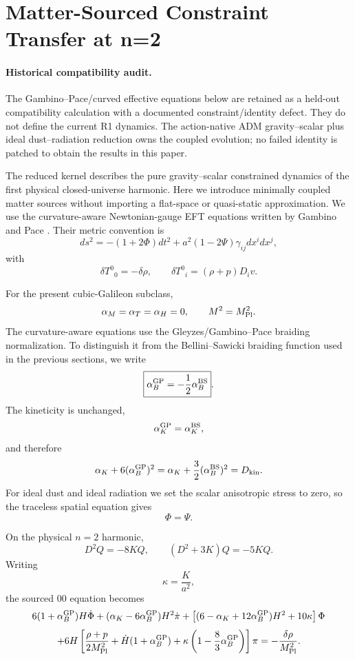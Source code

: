 \section{Matter-Sourced Constraint Transfer at n=2}

\paragraph{Historical compatibility audit.}
The Gambino--Pace/curved effective equations below are retained as a
held-out compatibility calculation with a documented constraint/identity
defect. They do not define the current R1 dynamics. The action-native
ADM gravity--scalar plus ideal dust--radiation reduction owns the coupled
evolution; no failed identity is patched to obtain the results in this paper.

The reduced kernel describes the pure gravity--scalar constrained dynamics of the first physical closed-universe harmonic. Here we introduce minimally coupled matter sources without importing a flat-space or quasi-static approximation. We use the curvature-aware Newtonian-gauge EFT equations written by Gambino and Pace \citep{GambinoPace2024}. Their metric convention is
\[
ds^2
=
-(1+2\Phi)dt^2
+
a^2(1-2\Psi)\gamma_{ij}dx^idx^j,
\]
with
\[
\delta T^0{}_0=-\delta\rho,
\qquad
\delta T^0{}_i=(\rho+p)D_i v.
\]

For the present cubic-Galileon subclass,
\[
\alpha_M=\alpha_T=\alpha_H=0,
\qquad
M^2=M_{\rm Pl}^2.
\]
The curvature-aware equations use the Gleyzes/Gambino--Pace braiding normalization. To distinguish it from the Bellini--Sawicki braiding function used in the previous sections, we write
\[
\boxed{
\alpha_B^{\rm GP}
=
-\frac12\alpha_B^{\rm BS}
}.
\]
The kineticity is unchanged,
\[
\alpha_K^{\rm GP}=\alpha_K^{\rm BS},
\]
and therefore
\[
\alpha_K+6(\alpha_B^{\rm GP})^2
=
\alpha_K+\frac32(\alpha_B^{\rm BS})^2
=
D_{\rm kin}.
\]
For ideal dust and ideal radiation we set the scalar anisotropic stress to zero, so the traceless spatial equation gives
\[
\boxed{\Phi=\Psi}.
\]

On the physical \(n=2\) harmonic,
\[
D^2Q=-8KQ,
\qquad
(D^2+3K)Q=-5KQ.
\]
Writing
\[
\kappa=\frac{K}{a^2},
\]
the sourced \(00\) equation becomes
\[
6(1+\alpha_B^{\rm GP})H\dot\Phi
+
(\alpha_K-6\alpha_B^{\rm GP})H^2\dot\pi
+
\left[
(6-\alpha_K+12\alpha_B^{\rm GP})H^2
+
10\kappa
\right]\Phi
\]
\[
+
6H
\left[
\frac{\rho+p}{2M_{\rm Pl}^2}
+
\dot H(1+\alpha_B^{\rm GP})
+
\kappa\left(1-\frac83\alpha_B^{\rm GP}\right)
\right]\pi
=
-\frac{\delta\rho}{M_{\rm Pl}^2}.
\]

